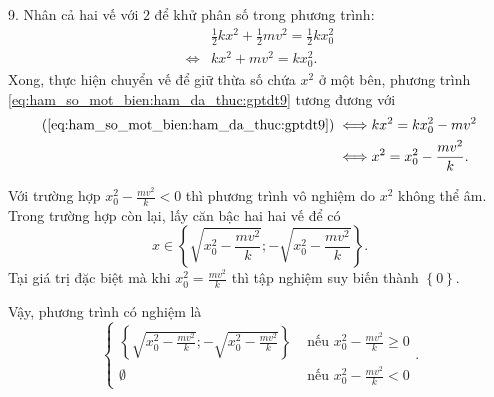 9. Nhân cả hai vế với $2$ để khử phân số trong phương trình:
\begin{align}
   &\frac{1}{2}kx^2 + \frac{1}{2}mv^2 = \frac{1}{2}kx_0^2 \nonumber \\
   \iff &kx^2 + mv^2 = kx_0^2. \label{eq:ham_so_mot_bien:ham_da_thuc:gptdt9}
\end{align}
Xong, thực hiện chuyển vế để giữ thừa số chứa $x^2$ ở một bên, phương trình \ref{eq:ham_so_mot_bien:ham_da_thuc:gptdt9} tương đương với
\begin{align*}
   (\ref{eq:ham_so_mot_bien:ham_da_thuc:gptdt9}) \iff &kx^2 = kx_0^2 - mv^2 \\
   \iff & x^2 = x_0^2 - \frac{mv^2}{k}.
\end{align*}

Với trường hợp $x_0^2 - \frac{mv^2}{k} < 0$ thì phương trình vô nghiệm do $x^2$ không thể âm. Trong trường hợp còn lại, lấy căn bậc hai hai vế để có $$x\in\left\{\sqrt{x_0^2 - \frac{mv^2}{k}}; -\sqrt{x_0^2 - \frac{mv^2}{k}}\right\}.$$ Tại giá trị đặc biệt mà khi $x_0^2 = \frac{mv^2}{k}$ thì tập nghiệm suy biến thành $\left\{0\right\}$.

Vậy, phương trình có nghiệm là 
$$
\begin{cases}
   \left\{\sqrt{x_0^2 - \frac{mv^2}{k}}; -\sqrt{x_0^2 - \frac{mv^2}{k}}\right\} &\text{ nếu } x_0^2 - \frac{mv^2}{k} \geq 0 \\
   \emptyset &\text{ nếu } x_0^2 - \frac{mv^2}{k} < 0
\end{cases}.
$$

